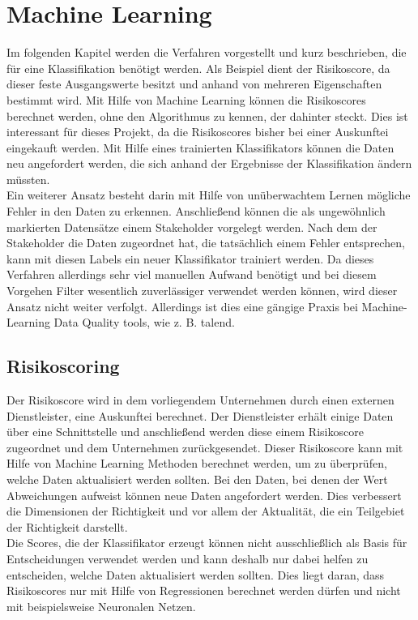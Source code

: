 \section{Machine Learning}
Im folgenden Kapitel werden die Verfahren vorgestellt und kurz beschrieben, die für eine Klassifikation benötigt werden. 
Als Beispiel dient der Risikoscore, da dieser feste Ausgangswerte besitzt und anhand von mehreren Eigenschaften bestimmt wird. 
Mit Hilfe von Machine Learning können die Risikoscores berechnet werden, ohne den Algorithmus zu kennen, der dahinter steckt. 
Dies ist interessant für dieses Projekt, da die Risikoscores bisher bei einer Auskunftei eingekauft werden.
Mit Hilfe eines trainierten Klassifikators können die Daten neu angefordert werden, die sich anhand der Ergebnisse der Klassifikation ändern müssten. 
\\
Ein weiterer Ansatz besteht darin mit Hilfe von unüberwachtem Lernen mögliche Fehler in den Daten zu erkennen.
Anschließend können die als ungewöhnlich markierten Datensätze einem Stakeholder vorgelegt werden.
Nach dem der Stakeholder die Daten zugeordnet hat, die tatsächlich einem Fehler entsprechen, kann mit diesen Labels ein neuer Klassifikator trainiert werden. 
Da dieses Verfahren allerdings sehr viel manuellen Aufwand benötigt und bei diesem Vorgehen Filter wesentlich zuverlässiger verwendet werden können, wird dieser Ansatz nicht weiter verfolgt.
Allerdings ist dies eine gängige Praxis bei Machine-Learning Data Quality tools, wie z. B. talend. 


\subsection{Risikoscoring}
Der Risikoscore wird in dem vorliegendem Unternehmen durch einen externen Dienstleister, eine Auskunftei berechnet. 
Der Dienstleister erhält einige Daten über eine Schnittstelle und anschließend werden diese einem Risikoscore zugeordnet und dem Unternehmen zurückgesendet.
Dieser Risikoscore kann mit Hilfe von Machine Learning Methoden berechnet werden, um zu überprüfen, welche Daten aktualisiert werden sollten.
Bei den Daten, bei denen der Wert Abweichungen aufweist können neue Daten angefordert werden.
Dies verbessert die Dimensionen der Richtigkeit und vor allem der Aktualität, die ein Teilgebiet der Richtigkeit darstellt.
\\
Die Scores, die der Klassifikator erzeugt können nicht ausschließlich als Basis für Entscheidungen verwendet werden und kann deshalb nur dabei helfen zu entscheiden, welche Daten aktualisiert werden sollten.
Dies liegt daran, dass Risikoscores nur mit Hilfe von Regressionen berechnet werden dürfen und nicht mit beispielsweise Neuronalen Netzen.



